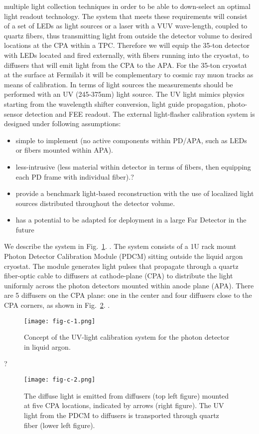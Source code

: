 multiple light collection techniques in order to be able to
down-select an optimal light readout technology. The system that meets
these requirements will consist of a set of LEDs as light sources or a
laser with a VUV wave-length, coupled to quartz fibers, thus
transmitting light from outside the detector volume to desired
locations at the CPA within a TPC. Therefore we will equip the 35-ton
detector with LEDs located and fired externally, with fibers running
into the cryostat, to diffusers that will emit light from the CPA to
the APA. For the 35-ton cryostat at the surface at Fermilab it will be
complementary to cosmic ray muon tracks as means of calibration. In
terms of light sources the measurements should be performed with an UV
(245-375nm) light source. The UV light mimics physics starting from
the wavelength shifter conversion, light guide propagation,
photo-sensor detection and FEE readout.  The external light-flasher
calibration system is designed under following assumptions:
\begin{itemize}
\item simple to implement (no active components within PD/APA, such as
  LEDs or fibers mounted within APA).
\item less-intrusive (less material within detector in terms of
  fibers, then equipping each PD frame with individual fiber).?\item
  provide a benchmark light-based reconstruction with the use of
  localized light sources distributed throughout the detector volume.
\item has a potential to be adapted for deployment in a large Far
  Detector in the future
\end{itemize}

We describe the system in Fig.~\ref{fig:fig-c-1}. . The system
consists of a 1U rack mount Photon Detector Calibration Module (PDCM)
sitting outside the liquid argon cryostat. The module generates light
pulses that propagate through a quartz fiber-optic cable to diffusers
at cathode-plane (CPA) to distribute the light uniformly across the
photon detectors mounted within anode plane (APA).  There are 5
diffusers on the CPA plane: one in the center and four diffusers close
to the CPA corners, as shown in Fig.~\ref{fig:fig-c-2}. .
%
 \begin{figure}[h]
  \centering
\texttt{[image: fig-c-1.png]}
\caption{Concept of the UV-light calibration system for the photon
  detector in liquid argon.}
\label{fig:fig-c-1}
\end{figure}
%
?%
 \begin{figure}[h]
  \centering
\texttt{[image: fig-c-2.png]}
\caption{The diffuse light is emitted from diffusers (top left figure)
  mounted at five CPA locations, indicated by arrows (right figure).
  The UV light from the PDCM to diffusers is transported through
  quartz fiber (lower left figure).}
\label{fig:fig-c-2}
\end{figure}
%

